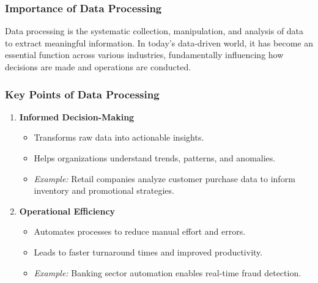 \documentclass[aspectratio=169]{beamer}
\begin{document}
\begin{frame}[fragile]
    \frametitle{Importance of Data Processing}
    Data processing is the systematic collection, manipulation, and analysis of data to extract meaningful information. In today's data-driven world, it has become an essential function across various industries, fundamentally influencing how decisions are made and operations are conducted.
\end{frame}

\begin{frame}[fragile]
    \frametitle{Key Points of Data Processing}
    \begin{enumerate}
        \item \textbf{Informed Decision-Making}
        \begin{itemize}
            \item Transforms raw data into actionable insights.
            \item Helps organizations understand trends, patterns, and anomalies.
            \item \textit{Example:} Retail companies analyze customer purchase data to inform inventory and promotional strategies.
        \end{itemize}
        
        \item \textbf{Operational Efficiency}
        \begin{itemize}
            \item Automates processes to reduce manual effort and errors.
            \item Leads to faster turnaround times and improved productivity.
            \item \textit{Example:} Banking sector automation enables real-time fraud detection.
        \end{itemize}
    \end{enumerate}
\end{frame}
\end{document}
